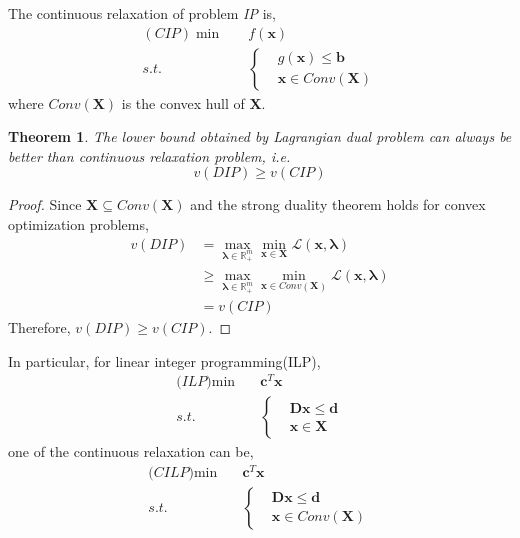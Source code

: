 \documentclass{article}
\newtheorem{thm}{Theorem}
\begin{document}
 The continuous relaxation of problem \textit{IP} is,
 \begin{align}
  	(\textit{CIP}) \min \quad & f(\bm{x}) \\
	 s.t. \quad & \left\{ 
	 \begin{aligned}
	 & g(\bm{x}) \leq \bm{b} \\
	 & \bm{x} \in Conv(\bm{X}) 
	 \end{aligned} \right.
 \end{align}
 where $Conv(\bm{X})$ is the convex hull of $\bm{X}$.

\begin{thm}
	The lower bound obtained by Lagrangian dual problem can always be better than continuous relaxation problem, i.e.
	\begin{equation} 
		v(DIP) \geq v(CIP)
	\end{equation}
\end{thm}

\begin{proof}
	Since $\bm{X} \subseteq Conv(\bm{X})$ and the strong duality theorem holds for convex optimization problems,
	\begin{align}
		v(DIP) & = \max_{\bm{\lambda} \in \mathbb{R}_+^m} \min_{\bm{x} \in \bm{X}} \mathcal{L}(\bm{x}, \bm{\lambda}) \\
		& \geq \max_{\bm{\lambda} \in \mathbb{R}_+^m} \min_{\bm{x} \in Conv(\bm{X})} \mathcal{L}(\bm{x}, \bm{\lambda}) \\
		& = v(CIP)
	\end{align}
	Therefore, $v(DIP) \geq v(CIP)$.
\end{proof}

In particular, for linear integer programming(ILP),
\begin{align}
	\textit{(ILP)} \min \quad & \bm{c}^T\bm{x} \\
	 s.t. \quad & \left\{ 
	\begin{aligned}
	& \bm{D}\bm{x} \leq \bm{d} \\
	& \bm{x} \in \bm{X}
	\end{aligned} \right.
\end{align}
one of the continuous relaxation can be,
\begin{align}
	\textit{(CILP)} \min \quad & \bm{c}^T\bm{x} \\
	s.t. \quad & \left\{ 
	\begin{aligned}
	& \bm{D}\bm{x} \leq \bm{d} \\
	& \bm{x} \in Conv(\bm{X})
	\end{aligned} \right.
\end{align}
\end{document}
